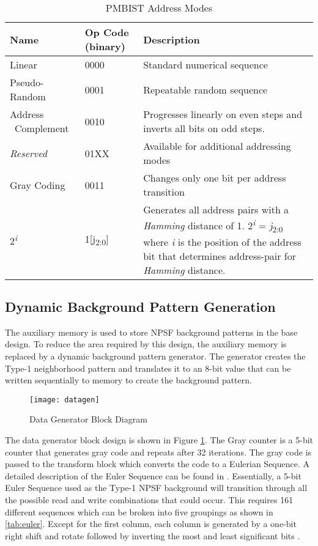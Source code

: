 \begin{table}[H]
  \caption{PMBIST Address Modes}
  \centering
 \begin{tabular}{|p{1in}|p{0.75in}|p{3in}|}
  \hline
  Name & Op Code (binary) & Description \\ [0.5ex]
  \hline\hline
  Linear              & 0000 & Standard numerical sequence  \\ 
  \hline
  Pseudo-Random       & 0001 & Repeatable random sequence \\ 
  \hline
  Address \ Complement  & 0010 & Progresses linearly on even steps and inverts all bits on odd steps.\\ 
  \hline
  \textit{Reserved}            & 01XX & Available for additional addressing modes \\ 
  \hline
  Gray Coding         & 0011 & Changes only one bit per address transition \\ 
  \hline
  2\textsuperscript{\textit{i}}& 1[j\textsubscript{2:0}] & Generates all address pairs with a \textit{Hamming} distance of 1.  2\textsuperscript{\textit{i}} = \textit{j}\textsubscript{2:0} where \textit{i} is the position of the address bit that determines address-pair for \textit{Hamming} distance. \\ 
  \hline
 \end{tabular}
\label{tab:addrmode}
\end{table}

\subsection{Dynamic Background Pattern Generation}
\label{sec:dg}
The auxiliary memory is used to store NPSF background patterns in the base design.  To reduce the area required by this design, the auxiliary memory is replaced by a dynamic background pattern generator.  The generator creates the Type-1 neighborhood pattern and translates it to an 8-bit value that can be written sequentially to memory to create the background pattern.

\begin{figure}[H]
  \centering
  \texttt{[image: datagen]}
  \caption{Data Generator Block Diagram}
  \label{fig:datagen}
\end{figure}
The data generator block design is shown in Figure \ref{fig:datagen}.  The Gray counter is a 5-bit counter that generates gray code and repeats after 32 iterations.  The gray code is passed to the transform block which converts the code to a Eulerian Sequence.  A detailed description of the Euler Sequence can be found in \cite{1675556}.  Essentially, a 5-bit Euler Sequence used as the Type-1 NPSF background will transition through all the possible read and write combinations that could occur.  This requires 161 different sequences which can be broken into five groupings as shown in \ref{tab:euler}.  Except for the first column, each column is generated by a one-bit right shift and rotate followed by inverting the most and least significant bits \cite{957583}.

